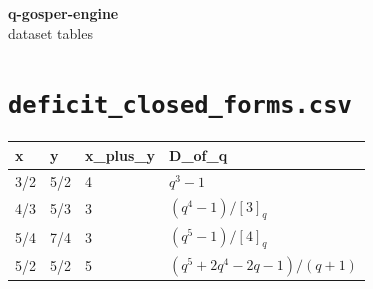 \documentclass[10pt]{article}
\begin{document}
\begin{center}\Large\textbf{q-gosper-engine} \\ \normalsize dataset tables\end{center}
\vspace{1em}
\section*{\texttt{deficit\_closed\_forms.csv}}
{\footnotesize
\begin{longtable}{@{}llll@{}}
\toprule
\textbf{x} & \textbf{y} & \textbf{x\_plus\_y} & \textbf{D\_of\_q} \\
\midrule\endhead
3/2 & 5/2 & 4 & $q^{3} - 1$ \\
4/3 & 5/3 & 3 & $(q^{4} - 1)/[3]_q$ \\
5/4 & 7/4 & 3 & $(q^{5} - 1)/[4]_q$ \\
5/2 & 5/2 & 5 & $(q^{5} + 2q^{4} - 2q - 1)/(q+1)$ \\
\bottomrule
\end{longtable}}
\end{document}
